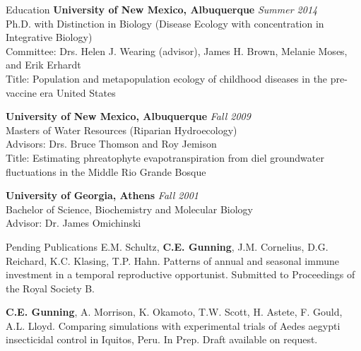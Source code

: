 \documentclass{resume} %
\begin{document}

\begin{rSection}{Education}
{\bf University of New Mexico, Albuquerque} \hfill {\em Summer 2014} \\ 
Ph.D. with Distinction in Biology (Disease Ecology with concentration in
Integrative Biology) \\
Committee: Drs. Helen J. Wearing (advisor), James H. Brown, Melanie Moses, and Erik Erhardt\\
Title: Population and metapopulation ecology of childhood diseases in the pre-vaccine era United States

{\bf University of New Mexico, Albuquerque} \hfill {\em Fall 2009} \\ 
Masters of Water Resources (Riparian Hydroecology) \\
Advisors: Drs. Bruce Thomson and Roy Jemison \\
Title: Estimating phreatophyte evapotranspiration from diel groundwater fluctuations in the Middle Rio Grande Bosque

{\bf University of Georgia, Athens} \hfill {\em Fall 2001} \\ 
Bachelor of Science, Biochemistry and Molecular Biology \\
Advisor: Dr. James Omichinski
\end{rSection}


\begin{rSection}{Pending Publications}
E.M. Schultz, {\bf C.E. Gunning}, J.M. Cornelius, D.G. Reichard, K.C. Klasing, 
T.P. Hahn. Patterns of annual and seasonal immune investment in a temporal reproductive
opportunist. Submitted to Proceedings of the Royal Society B.

{\bf C.E. Gunning}, A. Morrison, K. Okamoto, T.W. Scott, H. Astete, F. Gould,
A.L. Lloyd. Comparing simulations with experimental trials of Aedes aegypti insecticidal
control in Iquitos, Peru. In Prep. Draft available on request.


\end{rSection}
\end{document}

